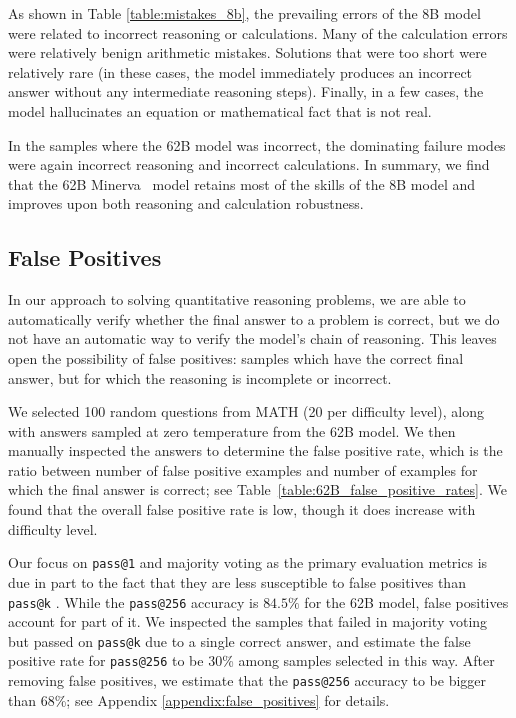 As shown in Table \ref{table:mistakes_8b}, the prevailing errors of the 8B model were related to incorrect reasoning or calculations. Many of the calculation errors were relatively benign arithmetic mistakes. Solutions that were too short were relatively rare (in these cases, the model immediately produces an incorrect answer without any intermediate reasoning steps). Finally, in a few cases, the model hallucinates an equation or mathematical fact that is not real.

In the samples where the 62B model was incorrect, the dominating failure modes were again incorrect reasoning and incorrect calculations. In summary, we find that the 62B {Minerva~} model retains most of the skills of the 8B model and improves upon both reasoning and calculation robustness. 

\subsection{False Positives}
\label{sec:false_positives}

In our approach to solving quantitative reasoning problems, we are able to automatically verify whether the final answer to a problem is correct, but we do not have an automatic way to verify the model's chain of reasoning. This leaves open the possibility of false positives: samples which have the correct final answer, but for which the reasoning is incomplete or incorrect.

We selected 100 random questions from MATH (20 per difficulty level), along with answers sampled at zero temperature from the 62B model. We then manually inspected the answers to determine the false positive rate, which is the ratio between number of false positive examples and number of examples for which the final answer is correct; see Table~\ref{table:62B_false_positive_rates}. We found that the overall false positive rate is low, though it does increase with difficulty level.

Our focus on {\texttt{pass@1} } and majority voting as the primary evaluation metrics is due in part to the fact that they are less susceptible to false positives than {\texttt{pass@k} } \citep{alphacode}. While the \texttt{pass@256} accuracy is $84.5\%$ for the 62B model, false positives account for part of it. We inspected the samples that failed in majority voting but passed on \texttt{pass@k} due to a single correct answer, and estimate the false positive rate for \texttt{pass@256} to be 30\% among samples selected in this way. After removing false positives, we estimate that the \texttt{pass@256} accuracy to be bigger than 68\%; see Appendix  \ref{appendix:false_positives} for details.

